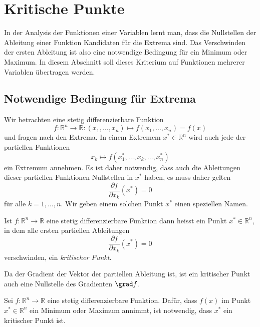 %
%
%
\section{Kritische Punkte
\label{buch:fuvar:section:kritisch}}
In der Analysis der Funktionen einer Variablen lernt man, dass die
Nullstellen der Ableitung einer Funktion Kandidaten für die Extrema
sind.
Das Verschwinden der ersten Ableitung ist also eine notwendige Bedingung
für ein Minimum oder Maximum.
In diesem Abschnitt soll dieses Kriterium auf Funktionen mehrerer
Variablen übertragen werden.

%
%
\subsection{Notwendige Bedingung für Extrema}
Wir betrachten eine stetig differenzierbare Funktion 
\[
f
\colon
\mathbb{R}^n\to\mathbb{R}
:
(x_1,\dots,x_n) \mapsto f(x_1,\dots,x_n) = f(x)
\]
und fragen nach den Extrema.
In einem Extremem $x^*\in\mathbb{R}^n$ wird auch jede der partiellen
Funktionen
\[
x_k \mapsto f(x_1^*,\dots,x_k,\dots,x_n^*)
\]
ein Extremum annehmen.
Es ist daher notwendig, dass auch die Ableitungen dieser partiellen
Funktionen Nullstellen in $x^*$ haben, es muss daher gelten
\begin{equation*}
\frac{\partial f}{\partial x_k}(x^*) = 0
\end{equation*}
für alle $k=1,\dots,n$.
Wir geben einem solchen Punkt $x^*$ einen speziellen Namen.

\begin{definition}
Ist $f\colon \mathbb{R}^n\to\mathbb{R}$ eine stetig differenzierbare
Funktion dann heisst ein Punkt $x^*\in\mathbb{R}^n$, in dem alle
ersten partiellen Ableitungen
\begin{equation}
\frac{\partial f}{\partial x_k}(x^*) = 0
\end{equation}
verschwinden, ein {\em kritischer Punkt}.
\end{definition}

Da der Gradient der Vektor der partiellen Ableitung ist, ist ein
kritischer Punkt auch eine Nullstelle des Gradienten $\grad f$.

\begin{satz}
Sei $f\colon\mathbb{R}^n\to\mathbb{R}$ eine stetig differenzierbare
Funktion.
Dafür, dass $f(x)$ im Punkt $x^*\in\mathbb{R}^n$ ein Minimum oder Maximum
annimmt, ist notwendig, dass $x^*$ ein kritischer Punkt ist.
\end{satz}

